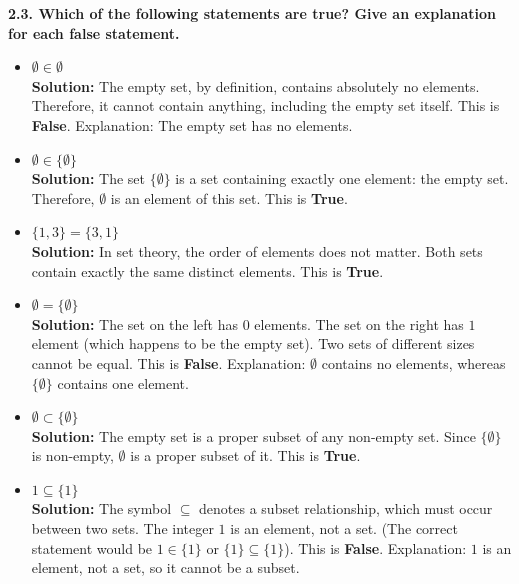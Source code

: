 \documentclass[11pt]{article}
\begin{document}
\vspace{0.5cm}
\textbf{2.3. Which of the following statements are true? Give an explanation for each false statement.}
\begin{itemize}
    \item[(a)] $\emptyset \in \emptyset$ \\
    \textbf{Solution:} The empty set, by definition, contains absolutely no elements. Therefore, it cannot contain anything, including the empty set itself. This is \textbf{False}. Explanation: The empty set has no elements.
    
    \item[(b)] $\emptyset \in \{\emptyset\}$ \\
    \textbf{Solution:} The set $\{\emptyset\}$ is a set containing exactly one element: the empty set. Therefore, $\emptyset$ is an element of this set. This is \textbf{True}.
    
    \item[(c)] $\{1, 3\} = \{3, 1\}$ \\
    \textbf{Solution:} In set theory, the order of elements does not matter. Both sets contain exactly the same distinct elements. This is \textbf{True}.
    
    \item[(d)] $\emptyset = \{\emptyset\}$ \\
    \textbf{Solution:} The set on the left has $0$ elements. The set on the right has $1$ element (which happens to be the empty set). Two sets of different sizes cannot be equal. This is \textbf{False}. Explanation: $\emptyset$ contains no elements, whereas $\{\emptyset\}$ contains one element.
    
    \item[(e)] $\emptyset \subset \{\emptyset\}$ \\
    \textbf{Solution:} The empty set is a proper subset of any non-empty set. Since $\{\emptyset\}$ is non-empty, $\emptyset$ is a proper subset of it. This is \textbf{True}.
    
    \item[(f)] $1 \subseteq \{1\}$ \\
    \textbf{Solution:} The symbol $\subseteq$ denotes a subset relationship, which must occur between two sets. The integer $1$ is an element, not a set. (The correct statement would be $1 \in \{1\}$ or $\{1\} \subseteq \{1\}$). This is \textbf{False}. Explanation: $1$ is an element, not a set, so it cannot be a subset.
\end{itemize}
\end{document}

